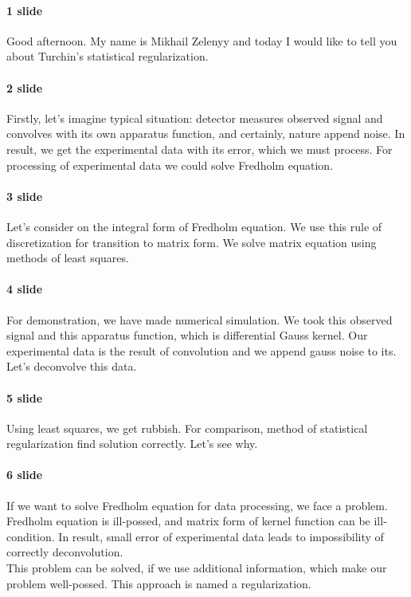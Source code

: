 \documentclass[a4paper]{article}
\begin{document}
\paragraph{1 slide}
Good afternoon. My name is Mikhail Zelenyy and today I would like to tell you about Turchin's statistical regularization. 

\paragraph{2 slide}
Firstly, let's imagine typical situation: detector measures observed signal and convolves with its own apparatus function, and certainly, nature append noise. In result, we get the experimental data with its error, which we must process. For processing of experimental data we could solve Fredholm equation.
\paragraph{3 slide}
Let's consider on the integral form of Fredholm equation. We use this rule of discretization for transition to matrix form. We solve matrix equation using methods of least squares.
\paragraph{4 slide}
For demonstration, we have made numerical simulation. We took this observed signal and this apparatus function, which is differential Gauss kernel. Our experimental data is the result of convolution and we append gauss noise to its. Let's deconvolve this data.  
\paragraph{5 slide}
Using least squares, we get rubbish. For comparison, method of statistical regularization find solution correctly. Let's see why.

\paragraph{6 slide}
If we want to solve Fredholm equation for data processing, we face a problem. Fredholm equation is ill-possed, and matrix form of kernel function   can be ill-condition. In result, small error of experimental data leads to impossibility of correctly deconvolution.\\
This problem can be solved, if we use additional information, which make our problem well-possed. 
This approach is named a regularization.
\end{document}
